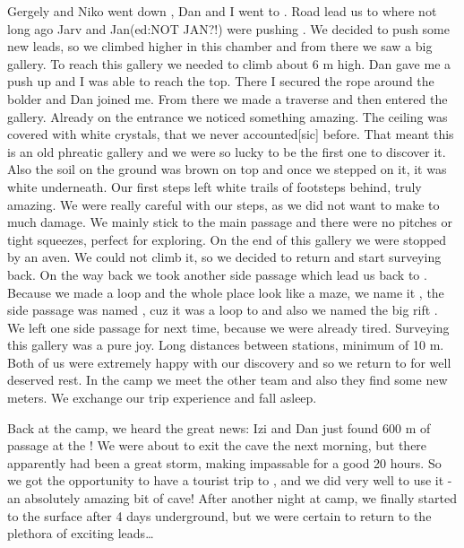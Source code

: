 Gergely and Niko went down , Dan and I went to
. Road lead us to  where not
long ago Jarv and Jan(ed:NOT JAN?!) were pushing . We decided to push some
new leads, so we climbed higher in this chamber and from there we saw a
big gallery. To reach this gallery we needed to climb about 6 m high.
Dan gave me a push up and I was able to reach the top. There I secured
the rope around the bolder and Dan joined me. From there we made a
traverse and then entered the gallery. Already on the entrance we
noticed something amazing. The ceiling was covered with white crystals,
that we never accounted[sic] before. That meant this is an old phreatic
gallery and we were so lucky to be the first one to discover it. Also
the soil on the ground was brown on top and once we stepped on it, it
was white underneath. Our first steps left white trails of footsteps
behind, truly amazing. We were really careful with our steps, as we did
not want to make to much damage. We mainly stick to the main passage and
there were no pitches or tight squeezes, perfect for exploring. On the
end of this gallery we were stopped by an aven. We could not climb it,
so we decided to return and start surveying back. On the way back we
took another side passage which lead us back to .
Because we made a loop and the whole place look like a maze, we name it
, the side passage was named , cuz it was a
loop to  and also we named the big rift . We
left one side passage for next time, because we were already tired.
Surveying this gallery was a pure joy. Long distances between stations,
minimum of 10 m. Both of us were extremely happy with our discovery and
so we return to  for well deserved rest. In the camp we meet
the other team and also they find some new meters. We exchange our trip
experience and fall asleep.






Back at the camp, we heard the great news: Izi and Dan just found 600 m
of passage at the ! We were about to exit the cave
the next morning, but there apparently had been a great storm, making
 impassable for a good 20 hours. So we got the opportunity
to have a tourist trip to , and we did very well to use
it - an absolutely amazing bit of cave! After another night at camp, we
finally started to the surface after 4 days underground, but we were
certain to return to the plethora of exciting leads\ldots{}

